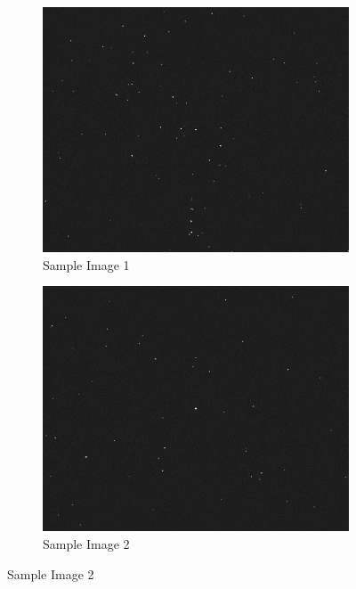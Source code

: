 \begin{figure}[h!]
    \centering
    \begin{subfigure}[b]{0.45\textwidth}
        \centering
        \includegraphics[width=\textwidth]{Figures/Model/Sample Images/Image_1.png}
        \caption{Sample Image 1}
        \label{fig:sample_1}
    \end{subfigure}
    \hfill
    \begin{subfigure}[b]{0.45\textwidth}
        \centering
        \includegraphics[width=\textwidth]{Figures/Model/Sample Images/Image_2.png}
        \caption{Sample Image 2}
        \label{fig:sample_2}

\end{subfigure}
\end{figure}
